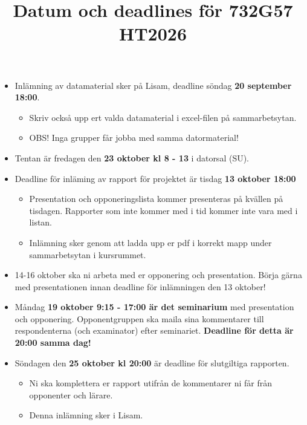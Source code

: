 \documentclass[a4paper]{article}
\title{Datum och deadlines för 732G57 HT2026}
\author{}
\date{}
\begin{document}
\maketitle
\thispagestyle{fancy}

\begin{itemize}
    \item Inlämning av datamaterial sker på Lisam, deadline söndag \textbf{20 september 18:00}.
    \begin{itemize}
        \item Skriv också upp ert valda datamaterial i excel-filen på sammarbetsytan.
        \item OBS! Inga grupper får jobba med samma datormaterial!
    \end{itemize}
    \item Tentan är fredagen den  \textbf{23 oktober kl 8 - 13} i datorsal (SU).
    \item Deadline för inläming av rapport för projektet är tisdag \textbf{13 oktober 18:00} 
    \begin{itemize}
        \item Presentation och opponeringslista kommer presenteras på kvällen på tisdagen. 
        Rapporter som inte kommer med i tid kommer inte vara med i listan.
        \item Inlämning sker genom att ladda upp er pdf i korrekt mapp under sammarbetsytan i kursrummet.
    \end{itemize}
    \item 14-16 oktober ska ni arbeta med er opponering och presentation. Börja gärna med presentationen
    innan deadline för inlämningen den 13 oktober!
    \item Måndag \textbf{19 oktober 9:15 - 17:00 är det seminarium} med presentation och opponering.
    Opponentgruppen ska maila sina kommentarer till respondenterna (och examinator) efter 
    seminariet. \textbf{Deadline för detta är 20:00 samma dag!}
    \item Söndagen den \textbf{25 oktober kl 20:00} är deadline för slutgiltiga rapporten.
    \begin{itemize}
        \item Ni ska komplettera er rapport utifrån de kommentarer ni får från opponenter och lärare.
        \item Denna inlämning sker i Lisam.
    \end{itemize}
\end{itemize}
\end{document}
